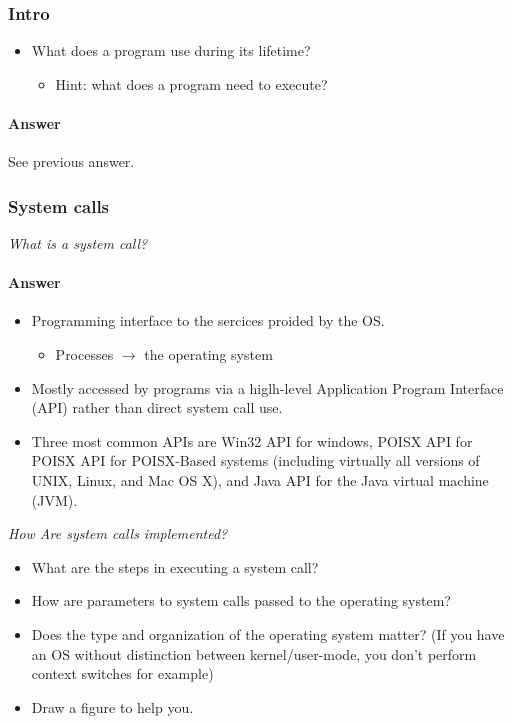 
\subsubsection*{Intro}
\begin{itemize}
\item What does a program use during its lifetime?
  \begin{itemize}
  \item Hint: what does a program need to execute?
  \end{itemize}
\end{itemize}

\paragraph{Answer}
See previous answer.

\subsubsection*{System calls}

\emph{What is a system call?}
\paragraph{Answer}
\begin{itemize}
\item Programming interface to the sercices proided by the OS.
  \begin{itemize}
  \item Processes $\rightarrow$ the operating system
  \end{itemize}
\item Mostly accessed by programs via a higlh-level Application Program Interface (API) rather than direct system call use.
\item Three most common APIs are Win32 API for windows, POISX API for POISX API for POISX-Based systems (including virtually all versions of UNIX, Linux, and Mac OS X), and Java API for the Java virtual machine (JVM).
\end{itemize}

\emph{How Are system calls implemented?}
\begin{itemize}
\item What are the steps in executing a system call?
\item How are parameters to system calls passed to the operating system?
\item Does the type and organization of the operating system matter? (If you have an OS without distinction between kernel/user-mode, you don't perform context switches for example)
\item Draw a figure to help you.
\end{itemize}

